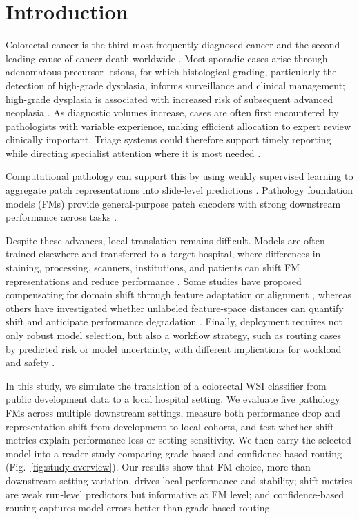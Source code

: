 \documentclass[runningheads]{llncs}
\begin{document}
\section{Introduction}
Colorectal cancer is the third most frequently diagnosed cancer and the second leading cause
of cancer death worldwide \cite{bray2024global}. Most sporadic cases arise through adenomatous 
precursor lesions, for which histological grading, particularly the detection of high-grade dysplasia, 
informs surveillance and clinical management; high-grade dysplasia is associated with increased risk of subsequent 
advanced neoplasia \cite{toll2011highgrade}. 
As diagnostic volumes increase, cases are often first encountered by pathologists with 
variable experience, making efficient allocation to expert review clinically important. 
Triage systems could therefore support timely reporting while directing specialist attention
where it is most needed \cite{mayall2023triage}.

Computational pathology can support this by using weakly supervised learning to aggregate patch representations 
into slide-level predictions \cite{campanella2019clinical,lu2021dataefficient}. Pathology foundation models 
(FMs) provide general-purpose patch encoders with strong downstream performance across tasks \cite{campanella2025clinicalbenchmark,neidlinger2025benchmarking}. 

Despite these advances, local translation remains difficult. 
Models are often trained elsewhere and transferred to a target hospital, 
where differences in staining, processing, scanners, institutions, and patients can shift FM 
representations and reduce performance \cite{thiringer2026scanner,howard2021sitespecific}. 
Some studies have proposed compensating for domain shift through feature adaptation or alignment \cite{huang2025knowledge,liu2025hasd}, 
whereas others have investigated whether unlabeled feature-space distances can quantify shift and anticipate performance degradation \cite{poceviciute2023detecting}.
Finally, deployment requires not only robust model selection, but also a workflow strategy, 
such as routing cases by predicted risk or model uncertainty, with different implications for workload and safety \cite{geaney2023translation,vasey2022decide}.

In this study, we simulate the translation of a colorectal WSI classifier from public development data to 
a local hospital setting. We evaluate five pathology FMs across multiple downstream settings, 
measure both performance drop and representation shift from development to local cohorts, 
and test whether shift metrics explain performance loss or setting sensitivity. 
We then carry the selected model into a reader study comparing grade-based and 
confidence-based routing (Fig.~\ref{fig:study-overview}). 
Our results show that FM choice, more than downstream setting variation, drives local performance 
and stability; shift metrics are weak run-level predictors but informative at FM level; 
and confidence-based routing captures model errors better than grade-based routing.
\end{document}
